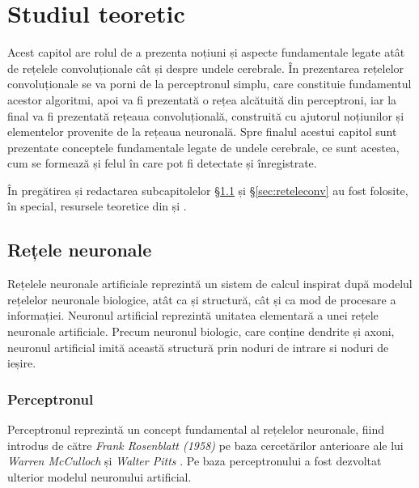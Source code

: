 \chapter{Studiul teoretic}\label{ch:2studiu_teoretic}
Acest capitol are rolul de a prezenta noțiuni și aspecte fundamentale legate atât de rețelele convoluționale cât și despre undele cerebrale. În prezentarea rețelelor convoluționale se va porni de la perceptronul simplu, care constituie fundamentul acestor algoritmi, apoi va fi prezentată o rețea alcătuită din perceptroni, iar la final va fi prezentată rețeaua convoluțională, construită cu ajutorul noțiunilor și elementelor provenite de la rețeaua neuronală. Spre finalul acestui capitol sunt prezentate conceptele fundamentale legate de undele cerebrale, ce sunt acestea, cum se formează și felul în care pot fi detectate și înregistrate.

În pregătirea și redactarea subcapitolelor \S\ref{sec:reteleneuronale} și \S\ref{sec:reteleconv} au fost folosite, în special, resursele teoretice din \cite{neuralnetbook:2015} și \cite{vrejoiu:2019}.

\section{Rețele neuronale}\label{sec:reteleneuronale}
Rețelele neuronale artificiale reprezintă un sistem de calcul inspirat după modelul rețelelor neuronale biologice, atât ca și structură, cât și ca mod de procesare a informației. Neuronul artificial reprezintă unitatea elementară a unei rețele neuronale artificiale. Precum neuronul biologic, care conține dendrite și axoni, neuronul artificial imită această structură prin noduri de intrare si noduri de ieșire.

\subsection{Perceptronul}
Perceptronul reprezintă un concept fundamental al rețelelor neuronale, fiind introdus de către \textit{Frank Rosenblatt (1958)} \cite{rosenblatt1962principles} pe baza cercetărilor anterioare ale lui \textit{Warren McCulloch} și \textit{Walter Pitts} \cite{McCulloch:427611}. Pe baza perceptronului a fost dezvoltat ulterior modelul neuronului artificial.

